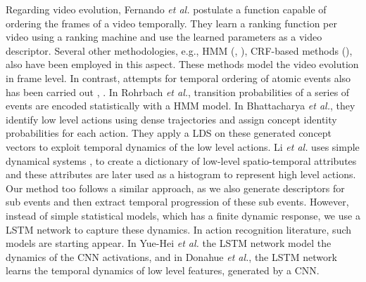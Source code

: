Regarding video evolution, Fernando \textit{et al.}\cite{fernando2015modeling} postulate
a function capable of ordering the frames of a video
temporally. They learn a ranking function per video using a ranking machine and use the learned parameters as
a video descriptor. Several other methodologies, e.g., HMM (\cite{wang2011hidden}, \cite{wu2014leveraging}),
CRF-based methods (\cite{song2013action}), also have been employed in this aspect. These methods model the video evolution in frame
level. In contrast, attempts for temporal ordering of atomic events also has been carried out \cite{rohrbach2012script}, \cite{bhattacharya2014recognition}.
In Rohrbach \textit{et al.}\cite{rohrbach2012script}, transition probabilities of a series of events are encoded statistically with a HMM model.
In Bhattacharya \textit{et al.}\cite{bhattacharya2014recognition}, they identify low level actions using dense trajectories and assign concept identity
probabilities for each action. They apply a LDS on these generated concept vectors to exploit temporal
dynamics of the low level actions. Li \textit{et al.}\cite{li2013recognizing} uses simple dynamical systems \cite{jackson1992perspectives},
\cite{kailath1974view} to create a dictionary of low-level spatio-temporal attributes and these attributes
are later used as a histogram to represent high level actions. Our method too follows a similar approach,
as we also generate descriptors for sub events and then extract temporal progression
of these sub events. However, instead of simple statistical models, which has a finite dynamic response,
we use a LSTM network \cite{hochreiter1997long} to capture these dynamics. In action recognition literature,
such models are starting appear. In Yue-Hei \textit{et al.}
\cite{yue2015beyond} the LSTM network model the dynamics of the CNN activations, and in Donahue \textit{et al.}\cite{donahue2015long},
the LSTM network learns the temporal dynamics of low level features, generated by a CNN.

